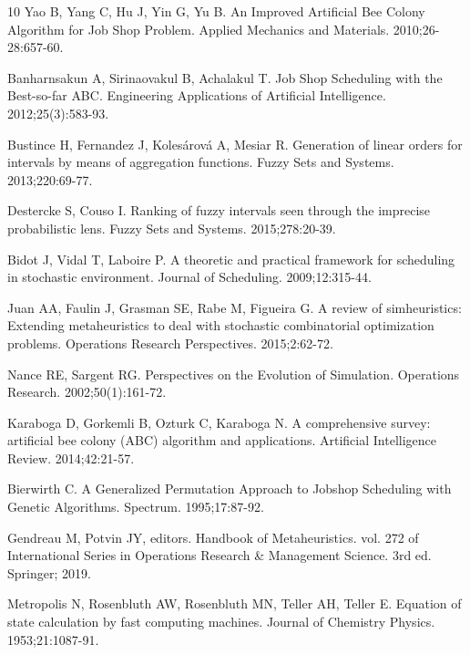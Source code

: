 \documentclass[icae]{iosart2x}
\begin{document}
\begin{thebibliography}{10}
Yao B, Yang C, Hu J, Yin G, Yu B.
\newblock An Improved Artificial Bee Colony Algorithm for Job Shop Problem.
\newblock Applied Mechanics and Materials. 2010;26-28:657-60.

Banharnsakun A, Sirinaovakul B, Achalakul T.
\newblock Job Shop Scheduling with the Best-so-far {ABC}.
\newblock Engineering Applications of Artificial Intelligence.
  2012;25(3):583-93.

Bustince H, Fernandez J, Koles\'arov\'a A, Mesiar R.
\newblock Generation of linear orders for intervals by means of aggregation
  functions.
\newblock Fuzzy Sets and Systems. 2013;220:69-77.

Destercke S, Couso I.
\newblock Ranking of fuzzy intervals seen through the imprecise probabilistic
  lens.
\newblock Fuzzy Sets and Systems. 2015;278:20-39.

Bidot J, Vidal T, Laboire P.
\newblock A theoretic and practical framework for scheduling in stochastic
  environment.
\newblock Journal of Scheduling. 2009;12:315-44.

Juan AA, Faulin J, Grasman SE, Rabe M, Figueira G.
\newblock A review of simheuristics: {E}xtending metaheuristics to deal with
  stochastic combinatorial optimization problems.
\newblock Operations Research Perspectives. 2015;2:62-72.

Nance RE, Sargent RG.
\newblock Perspectives on the Evolution of Simulation.
\newblock Operations Research. 2002;50(1):161-72.

Karaboga D, Gorkemli B, Ozturk C, Karaboga N.
\newblock A comprehensive survey: artificial bee colony ({ABC}) algorithm and
  applications.
\newblock Artificial Intelligence Review. 2014;42:21-57.

Bierwirth C.
\newblock A Generalized Permutation Approach to Jobshop Scheduling with Genetic
  Algorithms.
 Spectrum. 1995;17:87-92.

Gendreau M, Potvin JY, editors.
\newblock Handbook of Metaheuristics. vol. 272 of International Series in
  Operations Research \& Management Science.
\newblock 3rd ed. Springer; 2019.

Metropolis N, Rosenbluth AW, Rosenbluth MN, Teller AH, Teller E.
\newblock Equation of state calculation by fast computing machines.
\newblock Journal of Chemistry Physics. 1953;21:1087-91.


\end{thebibliography}
\end{document}
